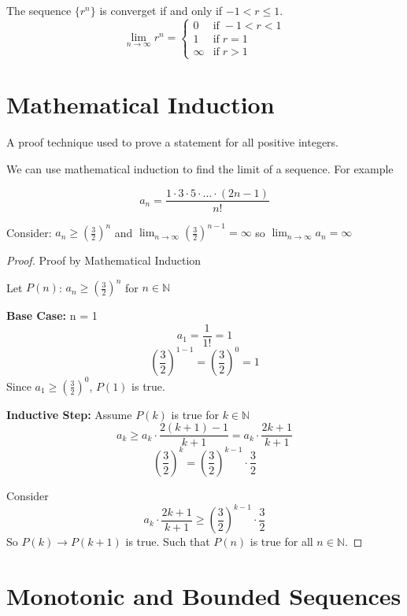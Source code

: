 The sequence $\{r^{n}\}$ is converget if and only if $-1 < r \le 1$.
\[
  \lim_{n \to \infty} r^{n} = \begin{cases}
    0 & \text{if} \; -1 < r < 1 \\
    1 & \text{if} \; r = 1 \\
    \infty & \text{if} \; r > 1
  \end{cases}
\]

\section{Mathematical Induction}

\begin{definition}
  A proof technique used to prove a statement for all positive integers.
\end{definition}

We can use mathematical induction to find the limit of a sequence. For example

\begin{equation}
  \nonumber
  a_{n} = \frac{1 \cdot 3 \cdot 5 \cdot \dots \cdot (2n - 1)}{n!}
\end{equation}

Consider: $a_{n} \ge (\frac{3}{2})^{n}$ and $\lim_{n \to \infty} (\frac{3}{2})^{n - 1} = \infty$ so $\lim_{n \to \infty} a_{n} = \infty$

\begin{proof}
  Proof by Mathematical Induction

  Let \(P(n)\): $a_{n} \ge (\frac{3}{2})^{n}$ for \(n \in \mathbb{N}\)

  \textbf{Base Case:} n = 1
  \[
    a_{1} = \frac{1}{1!} = 1
  \]
  \[
    (\frac{3}{2})^{1 - 1} = (\frac{3}{2})^0 = 1
  \]
  Since $a_{1} \ge (\frac{3}{2})^{0}$, \(P(1)\) is true.

  \textbf{Inductive Step:} Assume \(P(k)\) is true for \(k \in \mathbb{N}\)
  \[
    a_{k} \ge a_{k} \cdot \frac{2(k + 1) - 1}{k + 1} = a_k \cdot \frac{2k + 1}{k + 1}
  \]
  \[
    (\frac{3}{2})^k = (\frac{3}{2})^{k - 1} \cdot \frac{3}{2}
  \]

  Consider
  \[
    a_{k} \cdot \frac{2k + 1}{k + 1} \ge (\frac{3}{2})^{k - 1} \cdot \frac{3}{2}
  \]
  So \(P(k) \to P(k + 1)\) is true. Such that \(P(n)\) is true for all \(n \in \mathbb{N}\).
\end{proof}

\section{Monotonic and Bounded Sequences}

